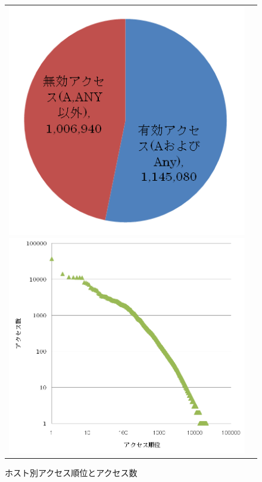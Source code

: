 \documentclass[mingoth,a4paper]{jsarticle}
\begin{document}
\begin{figure}[!h]
 \begin{tabular}{cc}
  \begin{minipage}{0.5\hsize}
   \begin{center}
    \includegraphics[width=0.7\hsize]{image200810/cdn-access.png}
    \caption{DNSアクセス種別}
    \label{fig:cdn-access}
   \end{center}
  \end{minipage}
  \begin{minipage}{0.5\hsize}
    \begin{center}
     \includegraphics[width=\hsize]{image200810/cdn-access-rank.png}
     \caption{ホスト別アクセス順位とアクセス数}
     \label{fig:cdn-access-rank}
    \end{center}
  \end{minipage}
 \end{tabular}
\end{figure}
\end{document}
